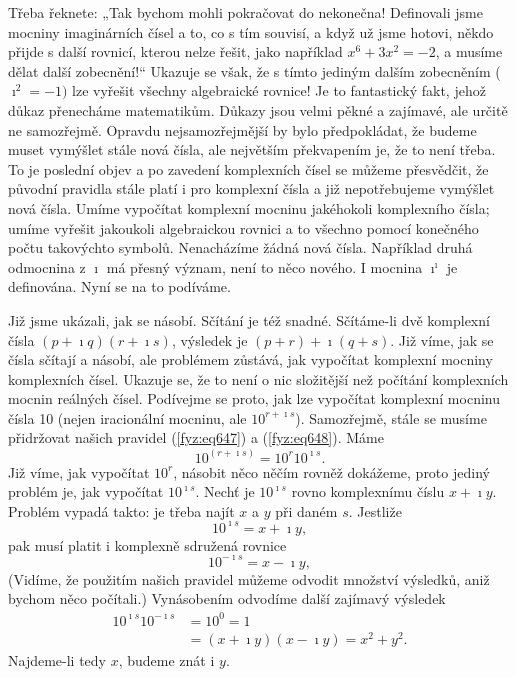     Třeba řeknete: „Tak bychom mohli pokračovat do nekonečna! Deﬁnovali jsme mocniny imaginárních
    čísel a to, co s tím souvisí, a když už jsme hotovi, někdo přijde s další rovnicí, kterou nelze
    řešit, jako například \(x^6 + 3x^2 = -2\), a musíme dělat další zobecnění!“ Ukazuje se však, že
    s tímto jediným dalším zobecněním (\(\imath^2 = -1)\) lze vyřešit všechny algebraické rovnice!
    Je to fantastický fakt, jehož důkaz přenecháme matematikům. Důkazy jsou velmi pěkné a zajímavé,
    ale určitě ne samozřejmě. Opravdu nejsamozřejmější by bylo předpokládat, že budeme muset
    vymýšlet stále nová čísla, ale největším překvapením je, že to není třeba. To je poslední objev
    a po zavedení komplexních čísel se můžeme přesvědčit, že původní pravidla stále platí i pro
    komplexní čísla a již nepotřebujeme vymýšlet nová čísla. Umíme vypočítat komplexní mocninu
    jakéhokoli komplexního čísla; umíme vyřešit jakoukoli algebraickou rovnici a to všechno pomocí
    konečného počtu takovýchto symbolů. Nenacházíme žádná nová čísla. Například druhá odmocnina z
    \(\imath\) má přesný význam, není to něco nového. I mocnina \(\imath^\imath\) je deﬁnována. Nyní
    se na to podíváme.

    Již jsme ukázali, jak se násobí. Sčítání je též snadné. Sčítáme-li dvě komplexní čísla \((p +
    \imath q)(r + \imath s)\), výsledek je \((p + r) + \imath(q + s)\). Již víme, jak se čísla
    sčítají a násobí, ale problémem zůstává, jak vypočítat komplexní mocniny komplexních čísel.
    Ukazuje se, že to není o nic složitější než počítání komplexních mocnin reálných čísel.
    Podívejme se proto, jak lze vypočítat komplexní mocninu čísla \num{10} (nejen iracionální
    mocninu, ale \(10^{r+\imath s}\)). Samozřejmě, stále se musíme přidržovat našich pravidel
    (\ref{fyz:eq647}) a (\ref{fyz:eq648}). Máme
    \begin{equation}\label{fyz:eq698}
      10^{(r+\imath s)}=10^r10^{\imath s}.
    \end{equation}
    Již víme, jak vypočítat \(10^r\), násobit něco něčím rovněž dokážeme, proto jediný problém je,
    jak vypočítat \(10^{\imath s}\). Nechť je \(10^{\imath s}\) rovno komplexnímu číslu \(x + \imath
    y\). Problém vypadá takto: je třeba najít \(x\) a \(y\) při daném \(s\). Jestliže
    \begin{equation*}
      10^{\imath s} = x + \imath y,
    \end{equation*}
    pak musí platit \num{i} komplexně sdružená rovnice
    \begin{equation*}
      10^{-\imath s} = x - \imath y,
    \end{equation*}
    (Vidíme, že použitím našich pravidel můžeme odvodit množství výsledků, aniž bychom něco
    počítali.) Vynásobením odvodíme další zajímavý výsledek
    \begin{align}
      10^{\imath s}10^{−\imath s} &=10^0=1                                     \nonumber\\
                                  &=(x+\imath y)(x−\imath y)=x^2+y^2.          \label{fyz:eq699}
    \end{align}
    Najdeme-li tedy \(x\), budeme znát i \(y\).

